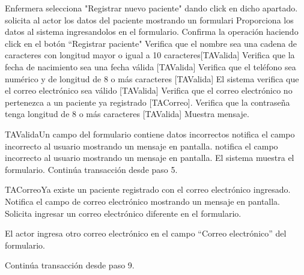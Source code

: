 \begin{UCtrayectoria}{Enfermera}
		\UCpaso[\UCactor] selecciona "Registrar nuevo paciente" dando click en dicho apartado.
		\UCpaso solicita al actor los datos del paciente mostrando un formulari
        \UCpaso [\UCactor] Proporciona los datos al sistema ingresandolos en el formulario.
         \UCpaso [\UCactor] Confirma la operación haciendo click en el botón ``Registrar paciente"
         \UCpaso Verifica que el nombre sea una cadena de caracteres con longitud mayor o igual a 10 caracteres[TAValida]
         \UCpaso Verifica que la fecha de nacimiento sea una fecha válida [TAValida]
         \UCpaso Verifica que el teléfono sea numérico y de longitud de 8 o más caracteres [TAValida]
         \UCpaso El sistema verifica que el correo electrónico sea válido [TAValida]
         \UCpaso Verifica que el correo electrónico no pertenezca a un paciente ya registrado [TACorreo].
		\UCpaso Verifica que la contraseña tenga longitud de 8 o más caracteres [TAValida]
        \UCpaso Muestra mensaje.
        

         
         



        

        
        
\end{UCtrayectoria}

\begin{UCtrayectoriaA}{TAValida}{Un campo del formulario contiene datos incorrectos}
\UCpaso notifica el campo incorrecto al usuario mostrando un mensaje en pantalla.
\UCpaso notifica el campo incorrecto al usuario mostrando un mensaje en pantalla.
\UCpaso El sistema muestra el formulario.
\UCpaso Continúa transacción desde paso 5.
	
	
\end{UCtrayectoriaA}


\begin{UCtrayectoriaA}{TACorreo}{Ya existe un paciente registrado con el correo electrónico ingresado.}
\UCpaso Notifica el campo de correo electrónico mostrando un mensaje en pantalla.
\UCpaso Solicita ingresar un correo electrónico diferente en el formulario.

\UCpaso [\UCactor] El actor ingresa otro correo electrónico en el campo “Correo electrónico” del formulario.

\UCpaso Continúa transacción desde paso 9.
\end{UCtrayectoriaA}

